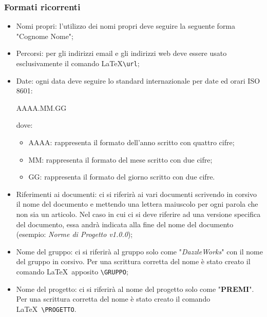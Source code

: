 \subsubsection{Formati ricorrenti}
\begin{itemize}
	\item Nomi propri: l'utilizzo dei nomi propri deve seguire la seguente forma "Cognome Nome";
	\item Percorsi: per gli indirizzi email e gli indirizzi web deve essere usato esclusivamente il comando \LaTeX  \verb|\url|;
	\item Date:  ogni data deve seguire lo standard internazionale per date ed orari ISO 8601:
	\begin{center}
		AAAA.MM.GG
	\end{center}
	dove:
	\begin{itemize}
		\item AAAA: rappresenta il formato dell'anno scritto con quattro cifre;
		\item MM: rappresenta il formato del mese scritto con due cifre;
		\item GG: rappresenta il formato del giorno scritto con due cifre.
	\end{itemize}
	\item Riferimenti ai documenti: ci si riferirà ai vari documenti scrivendo in corsivo il nome del documento e mettendo una lettera maiuscolo per ogni parola che non sia un articolo. Nel caso in cui ci si deve riferire ad una versione specifica del documento, essa andrà indicata alla fine  del nome del documento (esempio: \textit{Norme di Progetto v1.0.0});
	\item Nome del gruppo: ci si riferirà al gruppo solo come "\textit{DazzleWorks}" con il nome del gruppo in corsivo. Per una scrittura corretta del nome è stato creato il comando \LaTeX\ apposito \verb|\GRUPPO|;
	\item Nome del progetto: ci si riferirà al nome del progetto solo come "\textbf{PREMI}". Per una scrittura corretta del nome è stato creato il comando \LaTeX\ \verb|\PROGETTO|.
\end{itemize}

